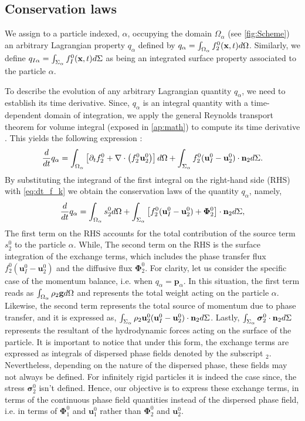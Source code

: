 \subsection{Conservation laws}
We assign to a particle indexed, $\alpha$, occupying the domain $\Omega_\alpha$ (see \ref{fig:Scheme}) an arbitrary Lagrangian property $q_\alpha$ defined by $q_\alpha  = \int_{\Omega_\alpha}  f_2^0(\textbf{x},t)  d\Omega$.
Similarly, we define $q_{I\alpha} = \int_{\Sigma_\alpha}  f_I^0(\textbf{x},t)  d\Sigma$ as being an integrated surface property associated to the particle $\alpha$.


To describe the evolution of any arbitrary Lagrangian quantity $q_\alpha$, we need to establish its time derivative.
Since, $q_\alpha$ is an integral quantity with a time-dependent domain of integration, we apply the general Reynolds transport theorem for volume integral (exposed in \ref{ap:math}) to compute its time derivative \citep{morel2015mathematical}.
This yields the following expression :
\begin{equation}
    \frac{d}{d t}  q_\alpha
    = \int_{\Omega_\alpha} \left[ \partial_t f_2^0 + \mathbf{\nabla}\cdot\left(f_2^0\textbf{u}_2^0\right) \right] d\Omega\\
    + \int_{\Sigma_\alpha}  f_2^0 (\textbf{u}_I^0-\textbf{u}_2^0)\cdot \textbf{n}_2  d\Sigma.
\end{equation}
By substituting the integrand of the first integral on the right-hand side (RHS) with \ref{eq:dt_f_k} we obtain the conservation laws of the quantity $q_\alpha$, namely,  
\begin{equation}
    \frac{d}{d t}  q_\alpha
    = \int_{\Omega_\alpha}  s_2^0  d\Omega
    + \int_{\Sigma_\alpha}  \left[
        f_2^0 (\textbf{u}_I^0-\textbf{u}_2^0) 
        + \mathbf{\Phi}_2^0 
        \right] \cdot \textbf{n}_2  d\Sigma,
    \label{eq:dt_q_alpha}
\end{equation}
The first term on the RHS accounts for the total contribution of the source term $s_2^0$ to the particle $\alpha$.
While, The second term on the RHS is the surface integration of the exchange terms, which includes the phase transfer flux $f_2^0 (\textbf{u}_I^0-\textbf{u}_2^0)$ and the diffusive flux $\mathbf{\Phi}_2^0$. 
For clarity, let us consider the specific case of the momentum balance, i.e. when $q_\alpha = \textbf{p}_\alpha$.
In this situation, the first term reads as $\int_{\Omega_\alpha}  \rho_2\textbf{g}  d\Omega$ and represents the total weight acting on the particle $\alpha$. 
Likewise, the second term represents the total source of momentum due to phase transfer, and it is expressed as, $\int_{\Sigma_\alpha}  \rho_2 \textbf{u}_2^0 (\textbf{u}_I^0-\textbf{u}_2^0)\cdot\textbf{n}_2  d\Sigma$. 
Lastly, $\int_{\Sigma_\alpha}  \bm{\sigma}_2^0\cdot\textbf{n}_2  d\Sigma$ represents the resultant of the hydrodynamic forces acting on the surface of the particle.
It is important to notice that under this form, the exchange terms are expressed as integrals of dispersed phase fields denoted by the subscript $_2$.
Nevertheless, depending on the nature of the dispersed phase, these fields may not always be defined.
For infinitely rigid particles it is indeed the case since, the stress $\bm{\sigma}_2^0$ isn't defined.  
Hence, our objective is to express these exchange terms, in terms of the continuous phase field quantities instead of the dispersed phase field, i.e. in terms of $\mathbf{\Phi}_1^0$ and $\textbf{u}_1^0$ rather than $\mathbf{\Phi}_2^0$ and $\textbf{u}_2^0$. 

